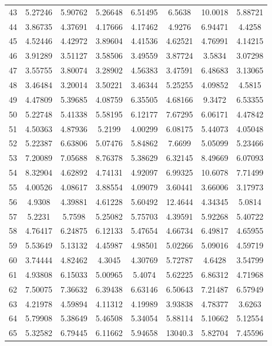 \begin{center}
\begin{longtable}{cccccccc}
43 & 5.27246 & 5.90762 & 5.26648 & 6.51495 & 6.5638 & 10.0018 & 5.88721\\
44 & 3.86735 & 4.37691 & 4.17666 & 4.17462 & 4.9276 & 6.94471 & 4.4258\\
45 & 4.52446 & 4.42972 & 3.89604 & 4.41536 & 4.62521 & 4.76991 & 4.14215\\
46 & 3.91289 & 3.51127 & 3.58506 & 3.49559 & 3.87724 & 3.5834 & 3.07298\\
47 & 3.55755 & 3.80074 & 3.28902 & 4.56383 & 3.47591 & 6.48683 & 3.13065\\
48 & 3.46484 & 3.20014 & 3.50221 & 3.46344 & 5.25255 & 4.09852 & 4.5815\\
49 & 4.47809 & 5.39685 & 4.08759 & 6.35505 & 4.68166 & 9.3472 & 6.53355\\
50 & 5.22748 & 5.41338 & 5.58195 & 6.12177 & 7.67295 & 6.06171 & 4.47842\\
51 & 4.50363 & 4.87936 & 5.2199 & 4.00299 & 6.08175 & 5.44073 & 4.05048\\
52 & 5.22387 & 6.63806 & 5.07476 & 5.84862 & 7.6699 & 5.05099 & 5.23466\\
53 & 7.20089 & 7.05688 & 8.76378 & 5.38629 & 6.32145 & 8.49669 & 6.07093\\
54 & 8.32904 & 4.62892 & 4.74131 & 4.92097 & 6.99325 & 10.6078 & 7.71499\\
55 & 4.00526 & 4.08617 & 3.88554 & 4.09079 & 3.60441 & 3.66006 & 3.17973\\
56 & 4.9308 & 4.39881 & 4.61228 & 5.60492 & 12.4644 & 4.34345 & 5.0814\\
57 & 5.2231 & 5.7598 & 5.25082 & 5.75703 & 4.39591 & 5.92268 & 5.40722\\
58 & 4.76417 & 6.24875 & 6.12133 & 5.47654 & 4.66734 & 6.49817 & 4.65955\\
59 & 5.53649 & 5.13132 & 4.45987 & 4.98501 & 5.02266 & 5.09016 & 4.59719\\
60 & 3.74444 & 4.82462 & 4.3045 & 4.30769 & 5.72787 & 4.6428 & 3.54799\\
61 & 4.93808 & 6.15033 & 5.00965 & 5.4074 & 5.62225 & 6.86312 & 4.71968\\
62 & 7.50075 & 7.36632 & 6.39438 & 6.63146 & 6.50643 & 7.21487 & 6.57949\\
63 & 4.21978 & 4.59894 & 4.11312 & 4.19989 & 3.93838 & 4.78377 & 3.6263\\
64 & 5.79908 & 5.38649 & 5.46508 & 5.34054 & 5.88114 & 5.10662 & 5.12554\\
65 & 5.32582 & 6.79445 & 6.11662 & 5.94658 & 13040.3 & 5.82704 & 7.45596\\

\end{longtable}
\end{center}

